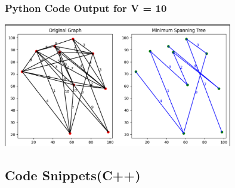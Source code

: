 \documentclass[a4paper, 10pt, twocolumn]{article}
\begin{document}
\subsubsection{Python Code Output for V = 10}
\begin{center}
    \includegraphics[width=0.75\textwidth]{kruskaleffecient.png}\par\vspace{1cm}
\end{center}

\subsection{Code Snippets(C++)}
\end{document}

